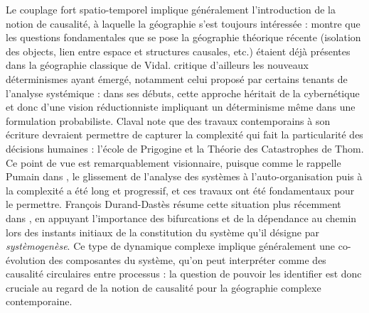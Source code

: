 Le couplage fort spatio-temporel implique généralement l'introduction de la notion de causalité, à laquelle la géographie s'est toujours intéressée : \cite{loi1985etude} montre que les questions fondamentales que se pose la géographie théorique récente (isolation des objects, lien entre espace et structures causales, etc.) étaient déjà présentes dans la géographie classique de Vidal. \cite{claval1985causalite} critique d'ailleurs les nouveaux déterminismes ayant émergé, notamment celui proposé par certains tenants de l'analyse systémique : dans ses débuts, cette approche héritait de la cybernétique et donc d'une vision réductionniste impliquant un déterminisme même dans une formulation probabiliste. Claval note que des travaux contemporains à son écriture devraient permettre de capturer la complexité qui fait la particularité des décisions humaines : l'école de Prigogine et la Théorie des Catastrophes de Thom. Ce point de vue est remarquablement visionnaire, puisque comme le rappelle Pumain dans \cite{pumain2003approche}, le glissement de l'analyse des systèmes à l'auto-organisation puis à la complexité a été long et progressif, et ces travaux ont été fondamentaux pour le permettre. François Durand-Dastès résume cette situation plus récemment dans \cite{durand2003geographes}, en appuyant l'importance des bifurcations et de la dépendance au chemin lors des instants initiaux de la constitution du système qu'il désigne par \emph{systèmogenèse}. %
Ce type de dynamique complexe implique généralement une co-évolution des composantes du système, qu'on peut interpréter comme des causalité circulaires entre processus : la question de pouvoir les identifier est donc cruciale au regard de la notion de causalité pour la géographie complexe contemporaine.

